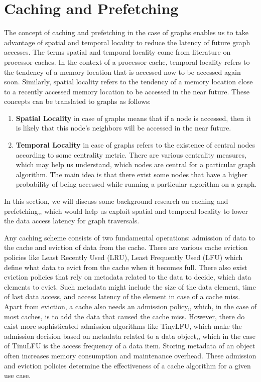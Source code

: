 \section{Caching and Prefetching}\label{sec:cachingDistSys}
The concept of caching and prefetching in the case of graphs enables us to take
advantage of spatial and temporal locality to reduce the latency of future graph
accesses. The terms spatial and temporal locality come from literature on
processor caches. In the context of a processor cache, temporal locality refers
to the tendency of a memory location that is accessed now to be
accessed again soon. Similarly, spatial locality refers to the 
tendency of a memory location close to a recently accessed memory location to be
accessed in the near future. These concepts can be translated to graphs as
follows:
\begin{enumerate}
    \item \textbf{Spatial Locality} in case of graphs means that if a node is
        accessed, then it is likely that this node's neighbors will be accessed
        in the near future.
    \item \textbf{Temporal Locality} in case of graphs refers to the existence
        of central nodes according to some centrality metric. There are
        various centrality measures\cite{klein2010centrality}, which may help us 
        understand, which nodes are central for a particular graph algorithm. The
        main idea is that there exist some nodes that have a higher probability
        of being accessed while running a particular algorithm on a graph.
\end{enumerate}
In this section, we will discuss some background research on caching and
prefetching,, which would help us exploit  spatial and temporal locality to lower
the data access latency for graph traversals.

\medskip
Any caching scheme consists of two fundamental operations: admission of
data to the cache and eviction of data from the cache. There are various cache
eviction policies like Least Recently Used (LRU), Least Frequently Used (LFU)
which define what data to evict from the cache when it becomes
full. There also exist eviction policies that rely on metadata related to the
data to decide, which data elements to evict. Such metadata might
include the size of the data element, time of last data access, and access latency
of the element in case of a cache miss. Apart from eviction, a cache also needs
an admission policy,, which, in the case of most caches, is to add the data that
caused the cache miss. However, there do exist more sophisticated
admission algorithms like TinyLFU\cite{einziger2017tinylfu}, which make the
admission decision based on metadata related to a data object,, which in the case of
TinuLFU is the access frequency of a data item. Storing metadata of an
object often increases memory consumption and maintenance overhead. These
admission and eviction policies determine the effectiveness of a cache algorithm
for a given use case.

